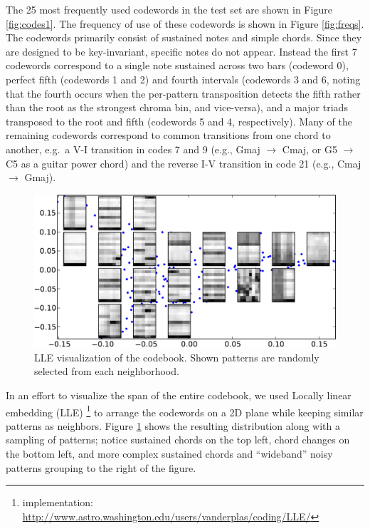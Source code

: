 \documentclass{article}
\newcommand{\eg}{e.g.~}
\begin{document}
The 25 most frequently used codewords in the test set are shown in
Figure \ref{fig:codes1}.  
The frequency of use of these codewords is shown in Figure \ref{fig:freqs}.
The codewords primarily consist of sustained
notes and simple chords.  Since they are designed to be key-invariant,
specific notes do not appear.  Instead the first 7 codewords
correspond to a single note sustained across two bars (codeword 0),
perfect fifth (codewords 1 and 2) and fourth intervals (codewords 3
and 6, noting that the fourth occurs when the per-pattern transposition 
detects the fifth rather than the root as the strongest chroma bin, and vice-versa), and a
major triads transposed to the root and fifth (codewords 5 and 4, respectively).  Many of the remaining
codewords correspond to common transitions from one chord to another,
\eg a V-I transition in codes 7 and 9
(e.g., Gmaj
$\rightarrow$ Cmaj, or G5 $\rightarrow$ C5 as a guitar power chord)
and the reverse I-V transition in code 21 (e.g., Cmaj
$\rightarrow$ Gmaj).

\begin{figure}[t]
\begin{center}
\includegraphics[width=.9\columnwidth]{codes_lle}
\end{center}
\caption{\small{
LLE visualization of the codebook.
Shown patterns are randomly selected
from each neighborhood.
}}
\label{fig:lle}
\end{figure}

In an effort to visualize the span of the entire codebook, we used 
Locally linear embedding (LLE) \cite{Roweis2000}\footnote{implementation:
  \url{http://www.astro.washington.edu/users/vanderplas/coding/LLE/}}
to arrange the codewords on a 2D plane while keeping similar 
patterns as neighbors.  Figure \ref{fig:lle} shows the resulting 
distribution along with a sampling of patterns; notice 
sustained
chords on the top left, chord changes on the bottom left, and more
complex sustained chords and ``wideband'' noisy patterns grouping to
the right of the figure.
\end{document}
